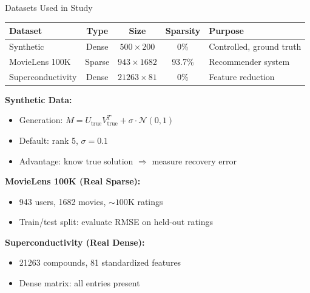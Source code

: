 \documentclass[aspectratio=169,usenames,dvipsnames]{beamer}
\begin{document}
\begin{frame}{Datasets Used in Study}

\begin{center}
\begin{tabular}{|l|c|c|c|l|}
\hline
\textbf{Dataset} & \textbf{Type} & \textbf{Size} & \textbf{Sparsity} & \textbf{Purpose} \\
\hline
Synthetic & Dense & $500 \times 200$ & 0\% & Controlled, ground truth \\
\hline
MovieLens 100K & Sparse & $943 \times 1682$ & 93.7\% & Recommender system \\
\hline
Superconductivity & Dense & $21263 \times 81$ & 0\% & Feature reduction \\
\hline
\end{tabular}
\end{center}

\vspace{0.5cm}

\textbf{Synthetic Data:}
\begin{itemize}
  \item Generation: $M = U_{\text{true}} V_{\text{true}}^T + \sigma \cdot \mathcal{N}(0,1)$
  \item Default: rank 5, $\sigma = 0.1$
  \item Advantage: know true solution $\Rightarrow$ measure recovery error
\end{itemize}

\textbf{MovieLens 100K (Real Sparse):}
\begin{itemize}
  \item 943 users, 1682 movies, $\sim 100$K ratings
  \item Train/test split: evaluate RMSE on held-out ratings
\end{itemize}

\textbf{Superconductivity (Real Dense):}
\begin{itemize}
  \item 21263 compounds, 81 standardized features
  \item Dense matrix: all entries present
\end{itemize}

\end{frame}
\end{document}

